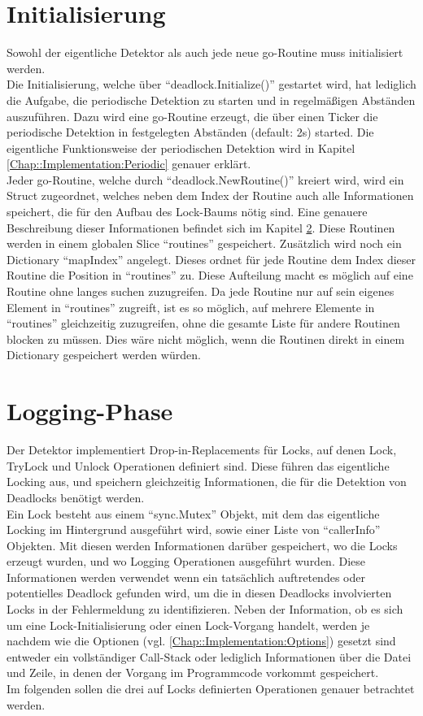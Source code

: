 \section{Initialisierung} \label{Chap::Implementation:Initialisierung}
Sowohl der eigentliche Detektor als auch jede neue go-Routine muss initialisiert 
werden.\\
Die Initialisierung, welche über ``deadlock.Initialize()'' gestartet wird, hat
lediglich die Aufgabe, die periodische Detektion zu starten und in regelmäßigen 
Abständen auszuführen. Dazu wird eine go-Routine erzeugt, die über einen Ticker
die periodische Detektion in festgelegten Abständen (default: 2s) started. Die
eigentliche Funktionsweise der periodischen Detektion wird in Kapitel 
\ref{Chap::Implementation:Periodic} genauer erklärt.\\
Jeder go-Routine, welche durch ``deadlock.NewRoutine()'' kreiert wird, wird ein
Struct zugeordnet, welches neben dem Index der Routine auch alle Informationen 
speichert, die für den Aufbau des Lock-Baums nötig sind. Eine genauere 
Beschreibung dieser Informationen befindet sich im Kapitel 
\ref{Chap::Implementation:Logging}. Diese Routinen werden in einem globalen 
Slice ``routines'' gespeichert. Zusätzlich wird noch ein Dictionary ``mapIndex'' 
angelegt. Dieses ordnet für jede Routine dem Index dieser Routine die Position
in ``routines'' zu. 
Diese Aufteilung macht es möglich auf eine Routine
ohne langes suchen zuzugreifen. Da jede Routine nur auf sein eigenes Element in 
``routines'' zugreift, ist es so möglich, auf mehrere Elemente in ``routines''
gleichzeitig zuzugreifen, ohne die gesamte Liste für andere Routinen blocken zu 
müssen. Dies wäre nicht möglich, wenn die Routinen direkt in einem Dictionary
gespeichert werden würden.



\section{Logging-Phase} \label{Chap::Implementation:Logging}
Der Detektor implementiert Drop-in-Replacements für Locks, auf denen Lock,
TryLock und Unlock Operationen definiert sind. 
Diese führen das eigentliche Locking aus, und 
speichern gleichzeitig Informationen, die für die Detektion von Deadlocks 
benötigt werden.\\
Ein Lock besteht aus einem ``sync.Mutex'' Objekt, mit dem das eigentliche
Locking im Hintergrund ausgeführt wird, sowie einer Liste von ``callerInfo''
Objekten. Mit diesen werden Informationen darüber gespeichert, wo die 
Locks erzeugt wurden, und wo Logging Operationen ausgeführt wurden. Diese 
Informationen werden verwendet wenn ein tatsächlich auftretendes 
oder potentielles Deadlock gefunden wird, um die in diesen Deadlocks involvierten 
Locks in der Fehlermeldung zu identifizieren. Neben der Information, ob es sich 
um eine Lock-Initialisierung oder einen Lock-Vorgang handelt, werden je nachdem
wie die Optionen (vgl. \ref{Chap::Implementation:Options}) gesetzt sind entweder 
ein vollständiger Call-Stack oder lediglich Informationen über die Datei und 
Zeile, in denen der Vorgang im Programmcode vorkommt gespeichert.\\
Im folgenden sollen die drei auf Locks definierten Operationen genauer betrachtet
werden.
